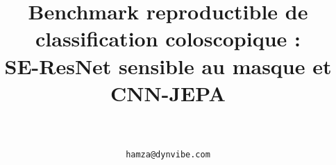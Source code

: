 
\usepackage[french]{babel}

\title{Benchmark reproductible de classification coloscopique :\\SE-ResNet sensible au masque et CNN-JEPA}

\author{\authorname\\
\small \affil\\
\small \texttt{hamza@dynvibe.com}}

\date{}


\maketitle













